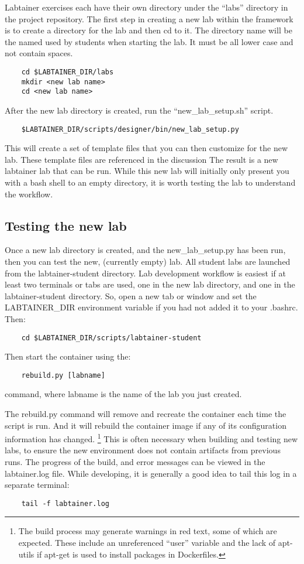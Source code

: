 \documentclass[12pt]{article}
\begin{document}
Labtainer exercises each have their own
directory under the ``labs'' directory in the project repository.
The first step in creating a new lab within the framework is to create
a directory for the lab and then cd to it.  The directory name will be the named
used by students when starting the lab.  It must be all lower case and not contain spaces.
\begin{verbatim}
    cd $LABTAINER_DIR/labs
    mkdir <new lab name>
    cd <new lab name>
\end{verbatim}

After the new lab directory is created, run the ``new\_lab\_setup.sh'' script.
\begin{verbatim}
    $LABTAINER_DIR/scripts/designer/bin/new_lab_setup.py
\end{verbatim}
This will create a set of template files that you can then customize
for the new lab.  These template files are referenced in the discussion
The result is a new labtainer lab that can be run.  While this new
lab will initially only present you with a bash shell to an
empty directory, it is worth testing the lab to understand the workflow.

\subsection{Testing the new lab}
Once a new lab directory is created, and the new\_lab\_setup.py has been run, then 
you can test the new, (currently empty) lab.  All student labs are launched from the
labtainer-student directory.  Lab development workflow is easiest if at least two
terminals or tabs are used, one in the new lab directory, and one in the labtainer-student
directory.  So, open a new tab or window and set the LABTAINER\_DIR environment variable
if you had not added it to your .bashrc.  Then:

\begin{verbatim}
    cd $LABTAINER_DIR/scripts/labtainer-student
\end{verbatim}
Then start the container using the:

\begin{verbatim}
    rebuild.py [labname] 
\end{verbatim}
command, where labname is the name of the lab you just created.  

The rebuild.py command will remove and recreate the container
each time the script is run.  And it will rebuild the container image if any of its configuration 
information has changed.  \footnote{The build process may generate warnings in red text, some of which are expected.  
These include an unreferenced ``user'' variable and the lack of apt-utils if apt-get is used to install packages in 
Dockerfiles.}  This is often necessary when building and testing new labs, to ensure the
new environment does not contain artifacts from previous runs.
The progress of the build, and error messages can be viewed in 
the labtainer.log file.  While developing, it is generally a good idea to tail this log in
a separate terminal:
\begin{verbatim}
    tail -f labtainer.log
\end{verbatim}
\end{document}
